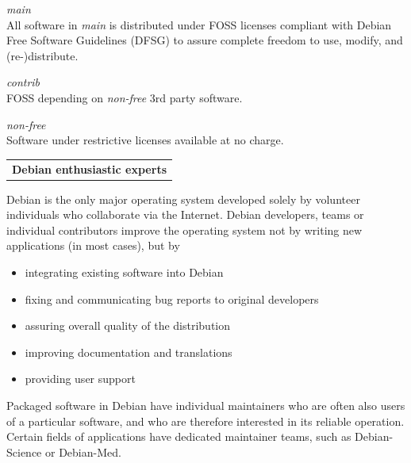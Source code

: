 \documentclass[letterpaper,landscape]{report}
\makeatletter
\newenvironment{ndtable}
  {\def\@captype{table}}
  {}
\newcommand{\ndheading}[3]{%
\vspace{0.5em}
\begin{ndtable}%
\rowcolors[\hline]{1}{#2}{} \arrayrulecolor{#3}
\begin{tabularx}{\columnwidth}{>{\centering\arraybackslash}X}\vspace{-.5em}\normalfont\large\bfseries
  #1\\\end{tabularx}
\end{ndtable}
\vspace{-.5em}
}
\newcommand{\ndsubsection}[1]{\ndheading{#1}{red!10}{red!30!gray}}
\makeatother
\begin{document}
\begin{multicols}{3}

\begin{description}[nolistsep,leftmargin=1pc,topsep=0em]
\item[Free as in freedom]\hfill\emph{main}\\
  All software in \emph{main} is distributed under FOSS licenses
  compliant with Debian Free Software Guidelines (DFSG) to assure
  complete freedom to use, modify, and (re-)distribute.
\item[Wanna-be free]\hfill\emph{contrib}\\
  FOSS depending on \emph{non-free} 3rd party software.
\item[Somewhat free]\hfill\emph{non-free}\\
  Software under restrictive licenses available at no charge.
\end{description}


\ndsubsection{Debian enthusiastic experts}

Debian is the only major operating system developed
solely by volunteer individuals who collaborate via the Internet.
Debian developers, teams or individual contributors improve the operating
system not by writing new applications (in most cases), but by
\begin{itemize}[nolistsep,topsep=0em,leftmargin=1pc]
\item integrating existing software into Debian
\item fixing and communicating bug reports to original developers
\item assuring overall quality of the distribution
\item improving documentation and translations
\item providing user support
\end{itemize}

Packaged software in Debian have individual maintainers who are
often also users of a particular software, and who are therefore interested in its
reliable operation. Certain fields of applications have dedicated maintainer
teams, such as Debian-Science or Debian-Med.


\end{multicols}
\end{document}
